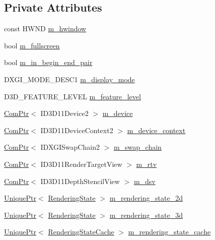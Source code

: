 \subsection*{Private Attributes}
\begin{DoxyCompactItemize}
\item 
const H\+W\+ND \hyperlink{classmage_1_1_renderer_adadc1028e5ad6551abbecfd8529e4aa1}{m\+\_\+hwindow}
\item 
bool \hyperlink{classmage_1_1_renderer_a72bb88b17491bd388460afae9d207b0a}{m\+\_\+fullscreen}
\item 
bool \hyperlink{classmage_1_1_renderer_a3caa1bad6cbfde8f87f807e5c97924e3}{m\+\_\+in\+\_\+begin\+\_\+end\+\_\+pair}
\item 
D\+X\+G\+I\+\_\+\+M\+O\+D\+E\+\_\+\+D\+E\+S\+C1 \hyperlink{classmage_1_1_renderer_af7ba5455da0dfa1f68ceeb49d43cf6f0}{m\+\_\+display\+\_\+mode}
\item 
D3\+D\+\_\+\+F\+E\+A\+T\+U\+R\+E\+\_\+\+L\+E\+V\+EL \hyperlink{classmage_1_1_renderer_aa97b108ef58f7d41ddb527f6ba2bfdf9}{m\+\_\+feature\+\_\+level}
\item 
\hyperlink{namespacemage_ae74f374780900893caa5555d1031fd79}{Com\+Ptr}$<$ I\+D3\+D11\+Device2 $>$ \hyperlink{classmage_1_1_renderer_aecf4bcb70dc186b4f2083df38d1e4bc3}{m\+\_\+device}
\item 
\hyperlink{namespacemage_ae74f374780900893caa5555d1031fd79}{Com\+Ptr}$<$ I\+D3\+D11\+Device\+Context2 $>$ \hyperlink{classmage_1_1_renderer_a47c4a1d46e84bbdc3ec876809633877e}{m\+\_\+device\+\_\+context}
\item 
\hyperlink{namespacemage_ae74f374780900893caa5555d1031fd79}{Com\+Ptr}$<$ I\+D\+X\+G\+I\+Swap\+Chain2 $>$ \hyperlink{classmage_1_1_renderer_a5419a7a11e8f0f69e92dd6a5cb9bd217}{m\+\_\+swap\+\_\+chain}
\item 
\hyperlink{namespacemage_ae74f374780900893caa5555d1031fd79}{Com\+Ptr}$<$ I\+D3\+D11\+Render\+Target\+View $>$ \hyperlink{classmage_1_1_renderer_a86ed436120830cef3e0173f85550aa50}{m\+\_\+rtv}
\item 
\hyperlink{namespacemage_ae74f374780900893caa5555d1031fd79}{Com\+Ptr}$<$ I\+D3\+D11\+Depth\+Stencil\+View $>$ \hyperlink{classmage_1_1_renderer_a27a62437e26957890563a68ebcde1909}{m\+\_\+dsv}
\item 
\hyperlink{namespacemage_a8c307fbcc33bce9b7f2aa4c26c3b95cf}{Unique\+Ptr}$<$ \hyperlink{structmage_1_1_rendering_state}{Rendering\+State} $>$ \hyperlink{classmage_1_1_renderer_ab55bf9fc3a357358d07419ec25dbe510}{m\+\_\+rendering\+\_\+state\+\_\+2d}
\item 
\hyperlink{namespacemage_a8c307fbcc33bce9b7f2aa4c26c3b95cf}{Unique\+Ptr}$<$ \hyperlink{structmage_1_1_rendering_state}{Rendering\+State} $>$ \hyperlink{classmage_1_1_renderer_adf94d97911e24a3f712b294967666014}{m\+\_\+rendering\+\_\+state\+\_\+3d}
\item 
\hyperlink{namespacemage_a8c307fbcc33bce9b7f2aa4c26c3b95cf}{Unique\+Ptr}$<$ \hyperlink{structmage_1_1_rendering_state_cache}{Rendering\+State\+Cache} $>$ \hyperlink{classmage_1_1_renderer_a3d9f823ecef314a974c4cdb3a71a1853}{m\+\_\+rendering\+\_\+state\+\_\+cache}
\end{DoxyCompactItemize}


